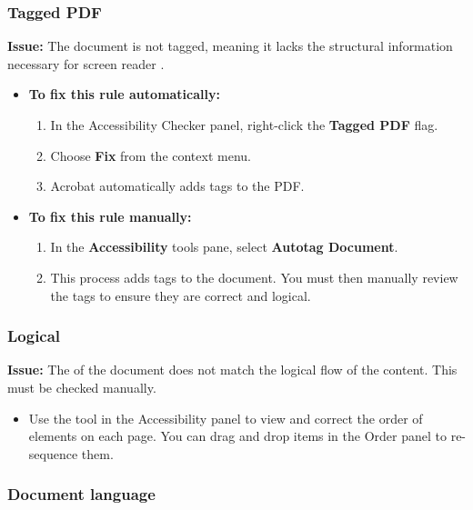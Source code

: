 \subsubsection{Tagged PDF}
\label{ssubsec:pdf-tagged}

\textbf{Issue:} The document is not tagged, meaning it lacks the structural information necessary for screen reader .

\begin{itemize}
	\item \textbf{To fix this rule automatically:}
	      \begin{enumerate}
		      \item In the Accessibility Checker panel, right-click the \textbf{Tagged PDF} flag.
		      \item Choose \textbf{Fix} from the context menu.
		      \item Acrobat automatically adds tags to the PDF.
	      \end{enumerate}
	\item \textbf{To fix this rule manually:}
	      \begin{enumerate}
		      \item In the \textbf{Accessibility} tools pane, select \textbf{Autotag Document}.
		      \item This process adds tags to the document. You must then manually review the tags to ensure they are correct and logical.
	      \end{enumerate}
\end{itemize}

\subsubsection{Logical }
\label{ssubsec:pdf-reading-order}

\textbf{Issue:} The  of the document does not match the logical flow of the content. This must be checked manually.

\begin{itemize}
	\item Use the \textbf{} tool in the Accessibility panel to view and correct the order of elements on each page. You can drag and drop items in the Order panel to re-sequence them.
\end{itemize}

\subsubsection{Document language}
\label{ssubsec:pdf-language}

